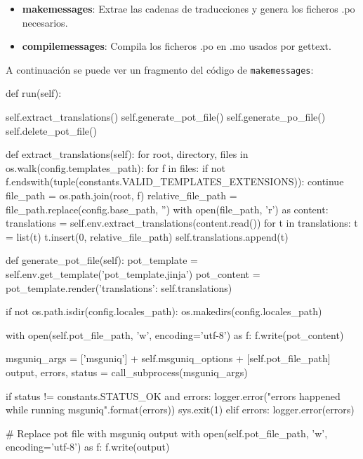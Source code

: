 \begin{itemize}
	\item \textbf{makemessages}: Extrae las cadenas de traducciones y genera los ficheros .po necesarios.
	\item \textbf{compilemessages}: Compila los ficheros .po en .mo usados por gettext.
\end{itemize}

A continuación se puede ver un fragmento del código de \texttt{makemessages}:

\begin{pythoncode}
def run(self):

    self.extract_translations()
    self.generate_pot_file()
    self.generate_po_file()
    self.delete_pot_file()

def extract_translations(self):
    for root, directory, files in os.walk(config.templates_path):
        for f in files:
            if not f.endswith(tuple(constants.VALID_TEMPLATES_EXTENSIONS)):
                continue
            file_path = os.path.join(root, f)
            relative_file_path = file_path.replace(config.base_path, '')
            with open(file_path, 'r') as content:
                translations = self.env.extract_translations(content.read())
                for t in translations:
                    t = list(t)
                    t.insert(0, relative_file_path)
                    self.translations.append(t)

def generate_pot_file(self):
    pot_template = self.env.get_template('pot_template.jinja')
    pot_content = pot_template.render({'translations': self.translations})

    if not os.path.isdir(config.locales_path):
        os.makedirs(config.locales_path)

    with open(self.pot_file_path, 'w', encoding='utf-8') as f:
        f.write(pot_content)

    msguniq_args = ['msguniq'] + self.msguniq_options + [self.pot_file_path]
    output, errors, status = call_subprocess(msguniq_args)

    if status != constants.STATUS_OK and errors:
        logger.error("errors happened while running msguniq\n{}".format(errors))
        sys.exit(1)
    elif errors:
        logger.error(errors)

    # Replace pot file with msguniq output
    with open(self.pot_file_path, 'w', encoding='utf-8') as f:
        f.write(output)
\end{pythoncode}
